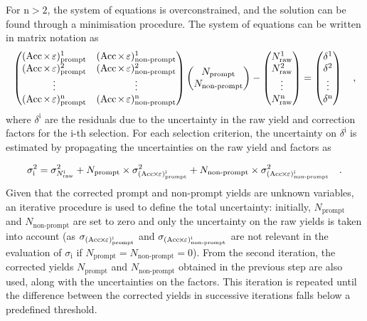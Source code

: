 For $\mathrm{n>2}$, the system of equations is overconstrained, and the solution can be found through a minimisation procedure. The system of equations can be written in matrix notation as
\begin{equation*}
    \begin{pmatrix}
        (\mathrm{Acc}\mkern-2mu\times\mkern-2mu\varepsilon)_\mathrm{prompt}^1 & (\mathrm{Acc}\mkern-2mu\times\mkern-2mu\varepsilon)_\mathrm{non\text{-}prompt}^1\\
        (\mathrm{Acc}\mkern-2mu\times\mkern-2mu\varepsilon)_\mathrm{prompt}^2 & (\mathrm{Acc}\mkern-2mu\times\mkern-2mu\varepsilon)_\mathrm{non\text{-}prompt}^2\\
        \vdots & \vdots\\
        (\mathrm{Acc}\mkern-2mu\times\mkern-2mu\varepsilon)_\mathrm{prompt}^\mathrm{n} & (\mathrm{Acc}\mkern-2mu\times\mkern-2mu\varepsilon)_\mathrm{non\text{-}prompt}^\mathrm{n}
    \end{pmatrix}
    \begin{pmatrix}
        N_\mathrm{prompt}\\
        N_\mathrm{non\text{-}prompt}
    \end{pmatrix}
    -
    \begin{pmatrix}
        N_\mathrm{raw}^1\\
        N_\mathrm{raw}^2\\
        \vdots\\
        N_\mathrm{raw}^\mathrm{n}
    \end{pmatrix}
    =
    \begin{pmatrix}
        \delta^1\\
        \delta^2\\
        \vdots\\
        \delta^\mathrm{n}
    \end{pmatrix}
    \quad ,
\end{equation*}
where $\delta^\mathrm{i}$ are the residuals due to the uncertainty in the raw yield and \aeff correction factors for the i-th selection. For each selection criterion, the uncertainty on $\delta^\mathrm{i}$ is estimated by propagating the uncertainties on the raw yield and \aeff factors as

\begin{equation*}
    \sigma_\mathrm{i}^2 = \sigma_{N_\mathrm{raw}^\mathrm{i}}^2 + N_\mathrm{prompt}\times\sigma^2_{(\mathrm{Acc}\mkern-2mu\times\mkern-2mu\varepsilon)_\mathrm{prompt}^\mathrm{i}} + N_\mathrm{non\text{-}prompt}\times\sigma^2_{(\mathrm{Acc}\mkern-2mu\times\mkern-2mu\varepsilon)_\mathrm{non\text{-}prompt}^\mathrm{i}}\quad .
\end{equation*}
Given that the corrected prompt and non-prompt yields are unknown variables, an iterative procedure is used to define the total uncertainty: initially, 
$N_{\mathrm{prompt}}$ and $N_{\mathrm{non\text{-}prompt}}$ are set to zero and only the uncertainty on the raw yields is taken into account (as $\sigma_{(\mathrm{Acc}\mkern-2mu\times\mkern-2mu\varepsilon)_\mathrm{prompt}^\mathrm{i}}$ and $\sigma_{(\mathrm{Acc}\mkern-2mu\times\mkern-2mu\varepsilon)_\mathrm{non\text{-}prompt}^\mathrm{i}}$ are not relevant in the evaluation of $\sigma_\mathrm{i}$ if $N_\mathrm{prompt}=N_\mathrm{non\text{-}prompt}=0$). From the second iteration, the corrected yields $N_{\mathrm{prompt}}$ and $N_{\mathrm{non\text{-}prompt}}$ obtained in the previous step are also used, along with the uncertainties on the \aeff factors. This iteration is repeated until the difference between the corrected yields in successive iterations falls below a predefined threshold.

